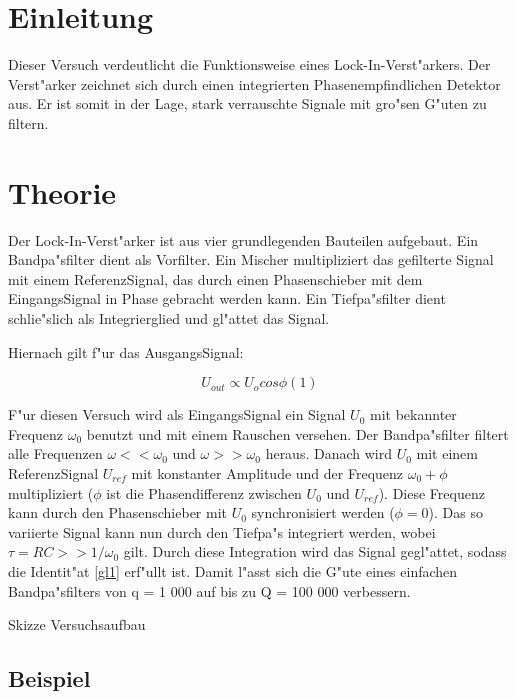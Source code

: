 \documentclass{scrartcl}
\begin{document}
	\section{Einleitung}

		Dieser Versuch verdeutlicht die Funktionsweise eines Lock-In-Verst"arkers.
		Der Verst"arker zeichnet sich durch einen integrierten Phasenempfindlichen Detektor aus.
		Er ist somit in der Lage, stark verrauschte Signale mit gro"sen G"uten zu filtern.


	\section{Theorie}

		Der Lock-In-Verst"arker ist aus vier grundlegenden Bauteilen aufgebaut.
		Ein Bandpa"sfilter dient als Vorfilter. Ein Mischer multipliziert das gefilterte Signal mit einem ReferenzSignal,
		das durch einen Phasenschieber mit dem EingangsSignal in Phase gebracht werden kann.
		Ein Tiefpa"sfilter dient schlie"slich als Integrierglied und gl"attet das Signal.

		Hiernach gilt f"ur das AusgangsSignal:

		\begin{equation}
			\label{gl1}
			U_{out} \propto U_o cos \phi (1)
		\end{equation}

		F"ur diesen Versuch wird als EingangsSignal ein Signal $U_0$ mit bekannter Frequenz $\omega_0$ benutzt und mit einem Rauschen versehen.
		Der Bandpa"sfilter filtert alle Frequenzen $\omega << \omega_0$ und $\omega >> \omega_0$ heraus.
		Danach wird $U_0$ mit einem ReferenzSignal $U_{ref}$ mit konstanter Amplitude und der Frequenz $\omega_0 + \phi$ multipliziert ($\phi$ ist die Phasendifferenz zwischen $U_0$ und $U_{ref}$).
		Diese Frequenz kann durch den Phasenschieber mit $U_0$ synchronisiert werden ($\phi = 0$). Das so variierte Signal kann nun durch den Tiefpa"s integriert werden,
		wobei $\tau = RC >> 1/\omega_0$ gilt.
		Durch diese Integration wird das Signal gegl"attet, sodass die Identit"at \ref{gl1} erf"ullt ist.
		Damit l"asst sich die G"ute eines einfachen Bandpa"sfilters von q = 1 000 auf bis zu Q = 100 000 verbessern.


		Skizze Versuchsaufbau

		\label{beispiel}
		\subsection{Beispiel} 
\end{document}
